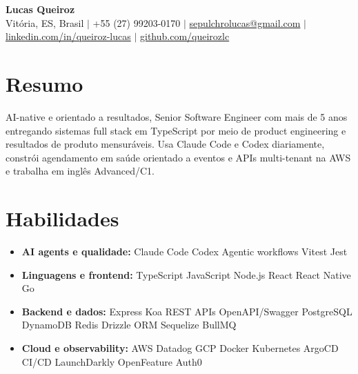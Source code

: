 \documentclass[letterpaper,10pt]{article}
\newcommand{\resumeItem}[1]{\item\small{#1}}
\newcommand{\resumeSubHeadingList}{\begin{itemize}[leftmargin=0.15in, label={}, nosep]}
\newcommand{\resumeSubHeadingListEnd}{\end{itemize}}
\begin{document}
\begin{center}
  \textbf{\Huge Lucas Queiroz} \\[3pt]
  \small Vit\'oria, ES, Brasil $|$ +55 (27) 99203-0170 $|$ \href{mailto:sepulchrolucas@gmail.com}{sepulchrolucas@gmail.com} $|$
  \href{https://linkedin.com/in/queiroz-lucas}{linkedin.com/in/queiroz-lucas} $|$
  \href{https://github.com/queirozlc}{github.com/queirozlc}
\end{center}
\vspace{2pt}

\section{Resumo}
AI-native e orientado a resultados, Senior Software Engineer com mais de 5 anos entregando sistemas full stack em TypeScript por meio de product engineering e resultados de produto mensur\'aveis. Usa Claude Code e Codex diariamente, constr\'oi agendamento em sa\'ude orientado a eventos e APIs multi-tenant na AWS e trabalha em ingl\^es Advanced/C1.

\section{Habilidades}
\resumeSubHeadingList
\resumeItem{\textbf{AI agents e qualidade:} Claude Code \textbar{} Codex \textbar{} Agentic workflows \textbar{} Vitest \textbar{} Jest}
\resumeItem{\textbf{Linguagens e frontend:} TypeScript \textbar{} JavaScript \textbar{} Node.js \textbar{} React \textbar{} React Native \textbar{} Go}
\resumeItem{\textbf{Backend e dados:} Express \textbar{} Koa \textbar{} REST APIs \textbar{} OpenAPI/Swagger \textbar{} PostgreSQL \textbar{} DynamoDB \textbar{} Redis \textbar{} Drizzle ORM \textbar{} Sequelize \textbar{} BullMQ}
\resumeItem{\textbf{Cloud e observability:} AWS \textbar{} Datadog \textbar{} GCP \textbar{} Docker \textbar{} Kubernetes \textbar{} ArgoCD \textbar{} CI/CD \textbar{} LaunchDarkly \textbar{} OpenFeature \textbar{} Auth0}
\resumeSubHeadingListEnd
\end{document}
